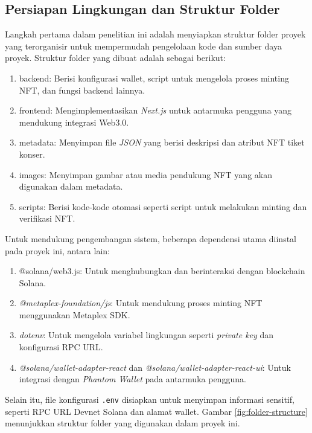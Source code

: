 \subsection{Persiapan Lingkungan dan Struktur Folder}
Langkah pertama dalam penelitian ini adalah menyiapkan struktur folder proyek yang terorganisir untuk mempermudah pengelolaan kode dan sumber daya proyek. Struktur folder yang dibuat adalah sebagai berikut:

\begin{enumerate}
    \item {backend:} Berisi konfigurasi wallet, script untuk mengelola proses minting NFT, dan fungsi backend lainnya.
    \item {frontend:} Mengimplementasikan \textit{Next.js} untuk antarmuka pengguna yang mendukung integrasi Web3.0.
    \item {metadata:} Menyimpan file \textit{JSON} yang berisi deskripsi dan atribut NFT tiket konser.
    \item {images:} Menyimpan gambar atau media pendukung NFT yang akan digunakan dalam metadata.
    \item {scripts:} Berisi kode-kode otomasi seperti script untuk melakukan minting dan verifikasi NFT.
\end{enumerate}

Untuk mendukung pengembangan sistem, beberapa dependensi utama diinstal pada proyek ini, antara lain:
\begin{enumerate}
    \item \textit{}{@solana/web3.js}: Untuk menghubungkan dan berinteraksi dengan blockchain Solana.
    \item \textit{@metaplex-foundation/js}: Untuk mendukung proses minting NFT menggunakan Metaplex SDK.
    \item \textit{dotenv}: Untuk mengelola variabel lingkungan seperti \textit{private key} dan konfigurasi RPC URL.
    \item \textit{@solana/wallet-adapter-react} dan \textit{@solana/wallet-adapter-react-ui}: Untuk integrasi dengan \textit{Phantom Wallet} pada antarmuka pengguna.
\end{enumerate}

Selain itu, file konfigurasi \texttt{.env} disiapkan untuk menyimpan informasi sensitif, seperti RPC URL Devnet Solana dan alamat wallet. Gambar \ref{fig:folder-structure} menunjukkan struktur folder yang digunakan dalam proyek ini.

